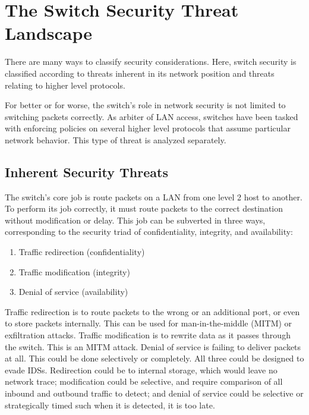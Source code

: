 \documentclass[journal]{IEEEtran}
\begin{document}
\section{The Switch Security Threat Landscape}

There are many ways to classify security considerations. Here, switch security is classified
according to threats inherent in its network position and threats relating to higher level
protocols.

For better or for worse, the switch's role in network security is not limited to switching packets
correctly. As arbiter of LAN access, switches have been tasked with enforcing policies on several
higher level protocols that assume particular network behavior. This type of threat is analyzed
separately.

\subsection{Inherent Security Threats}
The switch's core job is route packets on a LAN from one level 2 host to another. To perform its
job correctly, it must route packets to the correct destination without modification or delay. This
job can be subverted in three ways, corresponding to the security triad of confidentiality,
integrity, and availability:

\begin{enumerate}
  \item Traffic redirection (confidentiality) %
  \item Traffic modification (integrity)
  \item Denial of service (availability)
\end{enumerate}

Traffic redirection is to route packets to the wrong or an additional port, or even to store packets
internally. This can be used for man-in-the-middle (MITM) or exfiltration attacks. Traffic
modification is to rewrite data as it passes through the switch. This is an MITM attack. Denial of
service is failing to deliver packets at all. This could be done selectively or completely. All
three could be designed to evade IDSs. Redirection could be to internal storage, which would leave
no network trace; modification could be selective, and require comparison of all inbound and
outbound traffic to detect; and denial of service could be selective or strategically timed such
when it is detected, it is too late.
\end{document}
